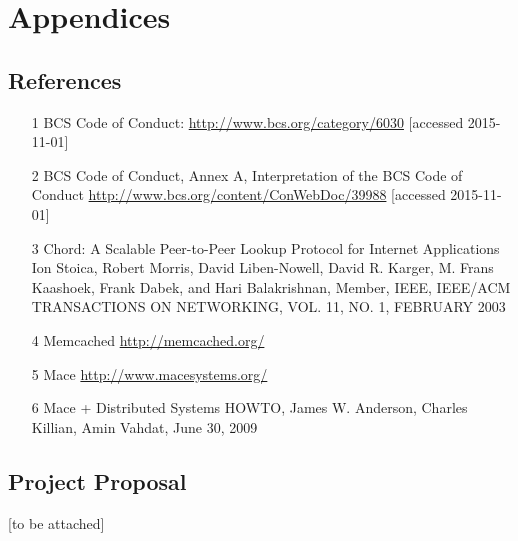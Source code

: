 \documentclass{article}
\begin{document}
\section{Appendices}
\subsection{References}
\begin{itemize}
\item[1] BCS Code of Conduct: \url{http://www.bcs.org/category/6030}  [accessed 2015-11-01]

\item[2] BCS Code of Conduct, Annex A, Interpretation of the BCS Code of Conduct \url{http://www.bcs.org/content/ConWebDoc/39988}  [accessed 2015-11-01]

\item[3] Chord: A Scalable Peer-to-Peer Lookup Protocol for Internet Applications Ion Stoica, Robert Morris, David Liben-Nowell, David R. Karger, M. Frans Kaashoek, Frank Dabek, and Hari Balakrishnan, Member, IEEE, IEEE/ACM TRANSACTIONS ON NETWORKING, VOL. 11, NO. 1, FEBRUARY 2003

\item[4] Memcached \url{http://memcached.org/}

\item[5] Mace \url{http://www.macesystems.org/}

\item[6] Mace + Distributed Systems HOWTO, James W. Anderson, Charles Killian, Amin Vahdat, June 30, 2009

\end{itemize}
\subsection{Project Proposal}
[to be attached]
\end{document}
